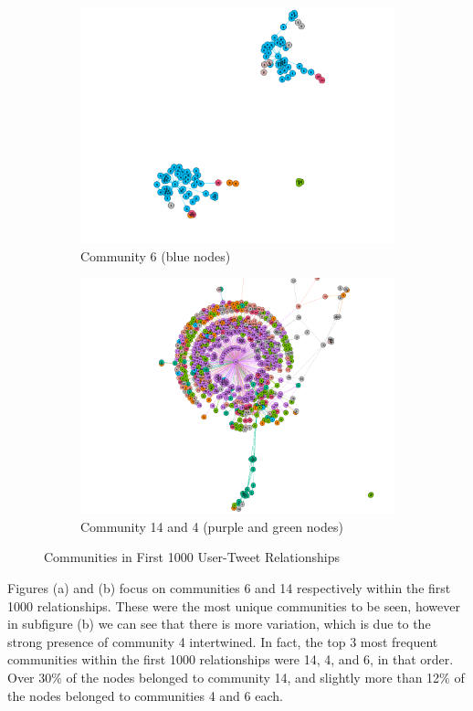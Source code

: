 \documentclass{article}
\begin{document}
\begin{figure}[h!]
\centering
\begin{subfigure}{.6\textwidth}
  \centering
  \includegraphics[width=.6\linewidth]{Graph Analytics/graph_1k_com6.png}
  \caption{Community 6 (blue nodes) }
  \label{fig:sub1}
\end{subfigure}%
\begin{subfigure}{.6\textwidth}
  \centering
  \includegraphics[width=.6\linewidth]{Graph Analytics/graph_1k_com14.png}
  \caption{Community 14 and 4 (purple and green nodes)}
  \label{fig:sub2}
\end{subfigure}
\caption{Communities in First 1000 User-Tweet Relationships}
\label{fig:test}
\end{figure}

Figures (a) and (b) focus on communities 6 and 14 respectively within the first 1000 relationships. These were the most unique communities to be seen, however in subfigure (b) we can see that there is more variation, which is due to the strong presence of community 4 intertwined. In fact, the top 3 most frequent communities within the first 1000 relationships were 14, 4, and 6, in that order. Over 30\% of the nodes belonged to community 14, and slightly more than 12\% of the nodes belonged to communities 4 and 6 each. \\
\end{document}
